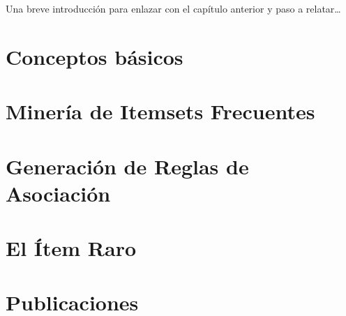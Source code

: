 Una breve introducción para enlazar con el capítulo anterior y paso a relatar\ldots



\section{Conceptos básicos}
\label{sec:arm:conceptos-basicos}









\section{Minería de Itemsets Frecuentes}
\label{sec:arm:fim}








\section{Generación de Reglas de Asociación}
\label{sec:arm:generacion-ar}





\section{El Ítem Raro}
\label{sec:arm:el-item-raro}










\section{Publicaciones}
\label{sec:arm:publicaciones}

